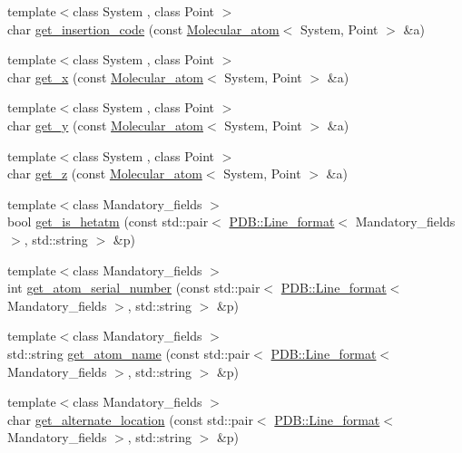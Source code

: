 \begin{DoxyCompactItemize}
\item 
{\footnotesize template$<$class System , class Point $>$ }\\char \hyperlink{namespaceESBTL_ad3cb445ac7085437cfcf2a66f0b8da48}{get\+\_\+insertion\+\_\+code} (const \hyperlink{classESBTL_1_1Molecular__atom}{Molecular\+\_\+atom}$<$ System, Point $>$ \&a)
\item 
{\footnotesize template$<$class System , class Point $>$ }\\char \hyperlink{namespaceESBTL_a1ca669e0cc6fbb8d85b50dddc8915d7c}{get\+\_\+x} (const \hyperlink{classESBTL_1_1Molecular__atom}{Molecular\+\_\+atom}$<$ System, Point $>$ \&a)
\item 
{\footnotesize template$<$class System , class Point $>$ }\\char \hyperlink{namespaceESBTL_afa283833be2a4931ed35558b5606de6a}{get\+\_\+y} (const \hyperlink{classESBTL_1_1Molecular__atom}{Molecular\+\_\+atom}$<$ System, Point $>$ \&a)
\item 
{\footnotesize template$<$class System , class Point $>$ }\\char \hyperlink{namespaceESBTL_aac89141951a093b3b419268729c9d1c1}{get\+\_\+z} (const \hyperlink{classESBTL_1_1Molecular__atom}{Molecular\+\_\+atom}$<$ System, Point $>$ \&a)
\item 
{\footnotesize template$<$class Mandatory\+\_\+fields $>$ }\\bool \hyperlink{namespaceESBTL_a5155cd79d2facb28e72549e36a68fae8}{get\+\_\+is\+\_\+hetatm} (const std\+::pair$<$ \hyperlink{classESBTL_1_1PDB_1_1Line__format}{P\+D\+B\+::\+Line\+\_\+format}$<$ Mandatory\+\_\+fields $>$, std\+::string $>$ \&p)
\item 
{\footnotesize template$<$class Mandatory\+\_\+fields $>$ }\\int \hyperlink{namespaceESBTL_a71b4faf4b354e45d2fc5e70df41db9c4}{get\+\_\+atom\+\_\+serial\+\_\+number} (const std\+::pair$<$ \hyperlink{classESBTL_1_1PDB_1_1Line__format}{P\+D\+B\+::\+Line\+\_\+format}$<$ Mandatory\+\_\+fields $>$, std\+::string $>$ \&p)
\item 
{\footnotesize template$<$class Mandatory\+\_\+fields $>$ }\\std\+::string \hyperlink{namespaceESBTL_a81f5f19c2754cfe55656283155101205}{get\+\_\+atom\+\_\+name} (const std\+::pair$<$ \hyperlink{classESBTL_1_1PDB_1_1Line__format}{P\+D\+B\+::\+Line\+\_\+format}$<$ Mandatory\+\_\+fields $>$, std\+::string $>$ \&p)
\item 
{\footnotesize template$<$class Mandatory\+\_\+fields $>$ }\\char \hyperlink{namespaceESBTL_a370818164a9e6054f0aa228536196897}{get\+\_\+alternate\+\_\+location} (const std\+::pair$<$ \hyperlink{classESBTL_1_1PDB_1_1Line__format}{P\+D\+B\+::\+Line\+\_\+format}$<$ Mandatory\+\_\+fields $>$, std\+::string $>$ \&p)

\end{DoxyCompactItemize}
